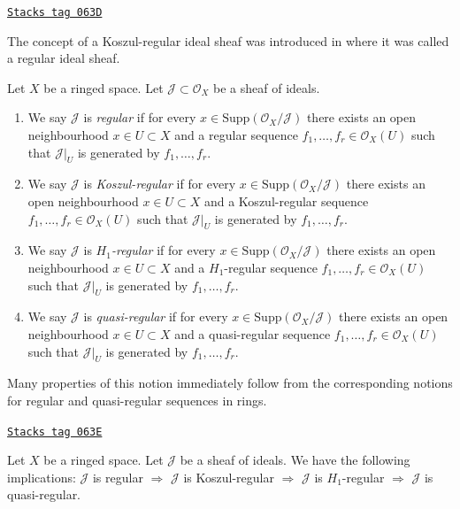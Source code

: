 \begin{definition}
\label{divisors-definition-regular-ideal-sheaf}
\href{https://stacks.math.columbia.edu/tag/063D}{\texttt{Stacks tag 063D}}

\begin{reference}
The concept of a Koszul-regular ideal sheaf was introduced in
\cite[Expose VII, Definition 1.4]{SGA6} where it was called a
regular ideal sheaf.
\end{reference}
Let $X$ be a ringed space. Let $\mathcal{J} \subset \mathcal{O}_X$
be a sheaf of ideals.
\begin{enumerate}
\item We say $\mathcal{J}$ is {\it regular} if for every
$x \in \text{Supp}(\mathcal{O}_X/\mathcal{J})$ there exists an open
neighbourhood $x \in U \subset X$ and a regular sequence
$f_1, \ldots, f_r \in \mathcal{O}_X(U)$ such that $\mathcal{J}|_U$
is generated by $f_1, \ldots, f_r$.
\item We say $\mathcal{J}$ is {\it Koszul-regular} if for every
$x \in \text{Supp}(\mathcal{O}_X/\mathcal{J})$ there exists an open
neighbourhood $x \in U \subset X$ and a Koszul-regular sequence
$f_1, \ldots, f_r \in \mathcal{O}_X(U)$ such that $\mathcal{J}|_U$
is generated by $f_1, \ldots, f_r$.
\item We say $\mathcal{J}$ is {\it $H_1$-regular} if for every
$x \in \text{Supp}(\mathcal{O}_X/\mathcal{J})$ there exists an open
neighbourhood $x \in U \subset X$ and a $H_1$-regular sequence
$f_1, \ldots, f_r \in \mathcal{O}_X(U)$ such that $\mathcal{J}|_U$
is generated by $f_1, \ldots, f_r$.
\item We say $\mathcal{J}$ is {\it quasi-regular} if for every
$x \in \text{Supp}(\mathcal{O}_X/\mathcal{J})$ there exists an open
neighbourhood $x \in U \subset X$ and a quasi-regular sequence
$f_1, \ldots, f_r \in \mathcal{O}_X(U)$ such that $\mathcal{J}|_U$
is generated by $f_1, \ldots, f_r$.
\end{enumerate}
\end{definition}

Many properties of this notion immediately follow from the
corresponding notions for regular and quasi-regular sequences
in rings.

\begin{lemma}
\label{divisors-lemma-regular-quasi-regular-scheme}
\href{https://stacks.math.columbia.edu/tag/063E}{\texttt{Stacks tag 063E}}

Let $X$ be a ringed space. Let $\mathcal{J}$ be a sheaf of ideals.
We have the following implications:
$\mathcal{J}$ is regular $\Rightarrow$
$\mathcal{J}$ is Koszul-regular $\Rightarrow$
$\mathcal{J}$ is $H_1$-regular $\Rightarrow$
$\mathcal{J}$ is quasi-regular.
\end{lemma}

